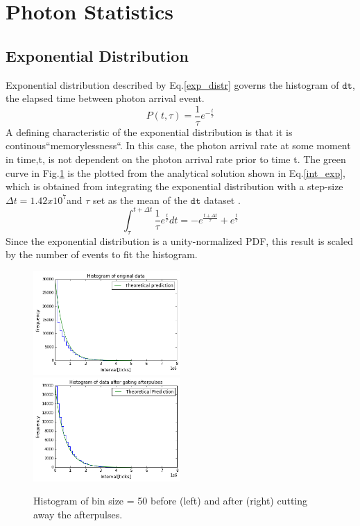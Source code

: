 \documentclass[12pt]{article}
\begin{document}
\section{Photon Statistics\label{pstats}}

 	\subsection{Exponential Distribution}
 	Exponential distribution described by Eq.\ref{exp_distr} governs the histogram of $\texttt{dt}$, the elapsed time between photon arrival event.
\begin{equation} \label{exp_distr}
 P(t,\tau)=\frac{1}{\tau}e^{-\frac{t}{\tau}}
\end{equation}
 	 A defining characteristic of the exponential distribution is that it is continous``memorylessness``. In this case, the photon arrival rate at some moment in time,t, is not dependent on the photon arrival rate prior to time t.  The green curve in Fig.\ref{fitted_histo_gate_or_no} is the plotted from the analytical solution shown in Eq.\ref{int_exp}, which is obtained from integrating the exponential distribution with a step-size $\Delta t =1.42x10^7$and  $\tau$ set as the mean of the $\texttt{dt}$ dataset .  
 	 \begin{equation}\label{int_exp}
 	 \int^{t+\Delta t}_\tau\frac{1}{\tau}e^\frac{t}{\tau}dt=-e^\frac{t+\Delta t}{\tau}+e^\frac{t}{\tau}
	\end{equation} 	  
Since the exponential distribution is a unity-normalized PDF, this result is scaled by the number of events to fit the histogram.
 	\begin{figure}[h]
		\includegraphics[width=0.5\textwidth]{figures/fitted_histo}
		\includegraphics[width=0.5\textwidth]{figures/fitted_histo_with_gating}
		\caption{Histogram of bin size = 50 before (left) and after (right) cutting away the afterpulses.}
		\label{fitted_histo_gate_or_no}
	\end{figure}
\end{document}

